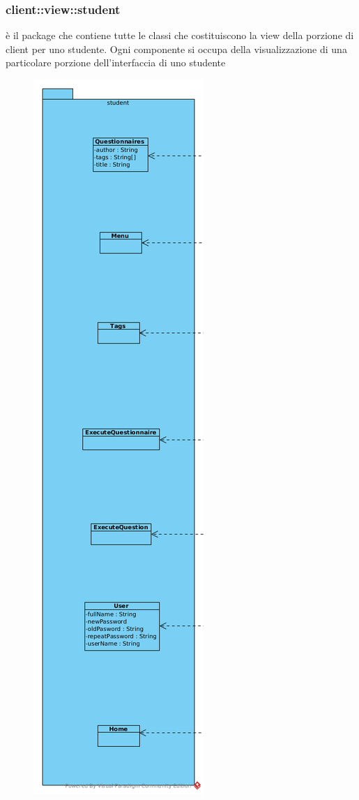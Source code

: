\subsubsection{client::view::student}
è il package che contiene tutte le classi che costituiscono la view della porzione di client per uno studente. Ogni componente si occupa della visualizzazione di una particolare porzione dell'interfaccia di uno studente\begin{center}
		\begin{figure}[H]
			\centering \includegraphics[scale=4, max width=\textwidth, max height=\myheight]{../img/diagrammiClassi/client/view/student.png}

\end{figure}
\end{center}
